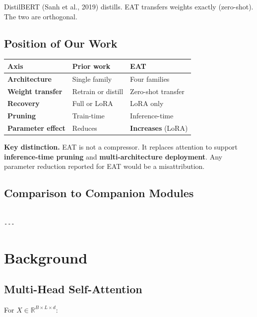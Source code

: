 DistilBERT (Sanh et al., 2019) distills. EAT transfers weights exactly 
(zero-shot). The two are orthogonal.

\subsection{Position of Our Work}

\begin{table}[H]
\centering
\small
\begin{tabular}{lll}
\toprule
\textbf{Axis} & \textbf{Prior work} & \textbf{EAT} \\
\midrule
\textbf{Architecture} & Single family & Four families \\
\textbf{Weight transfer} & Retrain or distill & Zero-shot transfer \\
\textbf{Recovery} & Full or LoRA & LoRA only \\
\textbf{Pruning} & Train-time & Inference-time \\
\textbf{Parameter effect} & Reduces & \textbf{Increases} (LoRA) \\
\bottomrule
\end{tabular}
\end{table}

\textbf{Key distinction.} EAT is not a compressor. It replaces attention to 
support \textbf{inference-time pruning} and \textbf{multi-architecture deployment}. 
Any parameter reduction reported for EAT would be a misattribution.

\subsection{Comparison to Companion Modules}

\begin{lstlisting}

---
\end{lstlisting}


\section{Background}

\subsection{Multi-Head Self-Attention}

For $X \in \mathbb{R}^{B \times L \times d}$:

